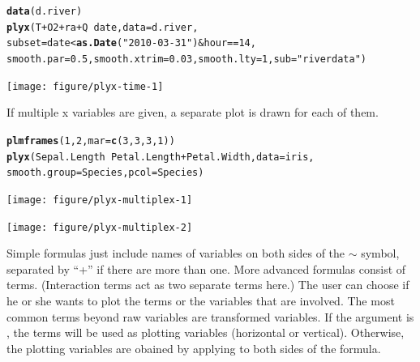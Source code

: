 \documentclass[11pt]{article}\usepackage[]{graphicx}\usepackage[]{color}
\makeatletter
\newcommand{\hlnum}[1]{\textcolor[rgb]{0.686,0.059,0.569}{#1}}%
\newcommand{\hlstr}[1]{\textcolor[rgb]{0.192,0.494,0.8}{#1}}%
\newcommand{\hlopt}[1]{\textcolor[rgb]{0,0,0}{#1}}%
\newcommand{\hlstd}[1]{\textcolor[rgb]{0.345,0.345,0.345}{#1}}%
\newcommand{\hlkwc}[1]{\textcolor[rgb]{0.333,0.667,0.333}{#1}}%
\newcommand{\hlkwd}[1]{\textcolor[rgb]{0.737,0.353,0.396}{\textbf{#1}}}%
\newenvironment{kframe}{%
 \def\at@end@of@kframe{}%
 \ifinner\ifhmode%
  \def\at@end@of@kframe{\end{minipage}}%
  \begin{minipage}{\columnwidth}%
 \fi\fi%
 \def\FrameCommand##1{\hskip\@totalleftmargin \hskip-\fboxsep
 \colorbox{shadecolor}{##1}\hskip-\fboxsep
     \hskip-\linewidth \hskip-\@totalleftmargin \hskip\columnwidth}%
 \MakeFramed {\advance\hsize-\width
   \@totalleftmargin\z@ \linewidth\hsize
   \@setminipage}}%
 {\par\unskip\endMakeFramed%
 \at@end@of@kframe}
\newenvironment{knitrout}{}{} %
\makeatother
\begin{document}
\begin{knitrout}
\color{fgcolor}\begin{kframe}
\begin{alltt}
  \hlkwd{data}\hlstd{(d.river)}
  \hlkwd{plyx}\hlstd{(T}\hlopt{+}\hlstd{O2}\hlopt{+}\hlstd{ra}\hlopt{+}\hlstd{Q}\hlopt{~}\hlstd{date,} \hlkwc{data}\hlstd{=d.river,}
       \hlkwc{subset}\hlstd{=date}\hlopt{<}\hlkwd{as.Date}\hlstd{(}\hlstr{"2010-03-31"}\hlstd{)}\hlopt{&}\hlstd{hour}\hlopt{==}\hlnum{14}\hlstd{,}
       \hlkwc{smooth.par}\hlstd{=}\hlnum{0.5}\hlstd{,} \hlkwc{smooth.xtrim}\hlstd{=}\hlnum{0.03}\hlstd{,} \hlkwc{smooth.lty}\hlstd{=}\hlnum{1}\hlstd{,} \hlkwc{sub}\hlstd{=}\hlstr{"river data"}\hlstd{)}
\end{alltt}
\end{kframe}
\texttt{[image: figure/plyx-time-1]} 

\end{knitrout}

If multiple x variables are given, a separate plot is drawn for each of them.
\begin{knitrout}
\color{fgcolor}\begin{kframe}
\begin{alltt}
\hlkwd{plmframes}\hlstd{(}\hlnum{1}\hlstd{,}\hlnum{2}\hlstd{,} \hlkwc{mar}\hlstd{=}\hlkwd{c}\hlstd{(}\hlnum{3}\hlstd{,}\hlnum{3}\hlstd{,}\hlnum{3}\hlstd{,}\hlnum{1}\hlstd{))}
\hlkwd{plyx}\hlstd{(Sepal.Length}\hlopt{~}\hlstd{Petal.Length}\hlopt{+}\hlstd{Petal.Width,} \hlkwc{data}\hlstd{=iris,}
     \hlkwc{smooth.group}\hlstd{=Species,} \hlkwc{pcol}\hlstd{=Species)}
\end{alltt}
\end{kframe}
\texttt{[image: figure/plyx-multiplex-1]} 

\texttt{[image: figure/plyx-multiplex-2]} 

\end{knitrout}


Simple formulas just include names of variables on both sides of the $\sim$
symbol, separated by ``+'' if there are more than one. 
More advanced formulas consist of terms.
(Interaction terms act as two separate terms here.)
The user can choose if he or she wants to plot the terms or the variables
that are involved. 
The most common terms beyond raw variables are transformed variables.
If the argument  is , the terms will be used as
plotting variables (horizontal or vertical). 
Otherwise, the plotting variables are obained by applying  to
both sides of the formula.
\end{document}
